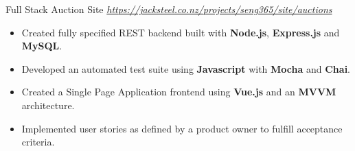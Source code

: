 \begin{cvsubsection}[3]{Full Stack Auction Site}{}{}
    \textit{\url{https://jacksteel.co.nz/projects/seng365/site/auctions}}
	\begin{itemize}
	    \item Created fully specified REST backend built with \textbf{Node.js}, \textbf{Express.js} and \textbf{MySQL}.
	    \item Developed an automated test suite using \textbf{Javascript} with \textbf{Mocha} and \textbf{Chai}.
	    \item Created a Single Page Application frontend using \textbf{Vue.js} and an \textbf{MVVM} architecture.
	    \item Implemented user stories as defined by a product owner to fulfill acceptance criteria.
	\end{itemize}
\end{cvsubsection}